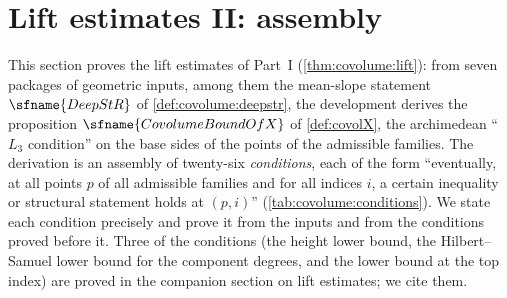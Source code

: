 \section{Lift estimates II: assembly}\label{sec:pf:lift2}

\providecommand{\lifttwomainT}{\mathrm{mainT}}
\providecommand{\lifttwolcv}{\operatorname{lcv}}
\providecommand{\lifttwork}{\operatorname{rk}}
\providecommand{\lifttwovdm}{\operatorname{vdm}}
\providecommand{\lifttwohdeg}{\widehat{\operatorname{deg}}}
\providecommand{\lifttwoLat}[1]{\Lambda^{\mathrm{#1}}}
\providecommand{\lifttwoP}[1]{\mathsf{#1}}
\providecommand{\lifttwoC}[1]{\mathsf{#1}}
\providecommand{\lifttwodF}{d_{\mathrm{Fl}}}
\providecommand{\lifttwobin}{B_T}
\providecommand{\lifttwozed}{\zeta}
\providecommand{\lifttwoCov}{\operatorname{Cov}}
\providecommand{\lifttwoComp}{\operatorname{Comp}}
\providecommand{\lifttwoEv}{\operatorname{Ev}}
\providecommand{\lifttwoL}{\mathcal{L}}
\providecommand{\lifttwoCv}{\mathcal{V}}

This section proves the lift estimates of Part~I (\cref{thm:covolume:lift}): from seven packages of
geometric inputs, among them the mean-slope statement $\sfname{DeepStR}$ of \cref{def:covolume:deepstr},
the development derives the proposition $\sfname{CovolumeBoundOfX}$ of \cref{def:covolX}, the archimedean
``$L_3$ condition'' on the base sides of the points of the admissible families. The derivation is an
assembly of twenty-six \emph{conditions}, each of the form ``eventually, at all points $p$ of all
admissible families and for all indices $i$, a certain inequality or structural statement holds at
$(p,i)$'' (\cref{tab:covolume:conditions}). We state each condition precisely and prove it from the
inputs and from the conditions proved before it. Three of the conditions (the height lower bound, the
Hilbert--Samuel lower bound for the component degrees, and the lower bound at the top index) are proved in
the companion section on lift estimates; we cite them.

